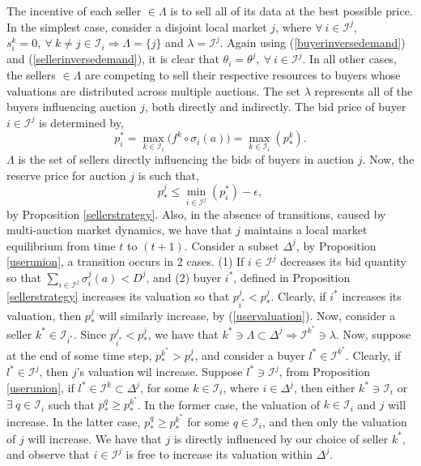 \documentclass[sigconf, anonymous]{acmart}
\newcommand{\mcI}{\mathcal{I}}
\newcommand{\g}{\sigma}
\theoremstyle{definition}
\begin{document}
\iffalse
Now, we have,
\begin{equation}\label{rho}
    \rho^j(p_*^j) \le \displaystyle\sum_{i\in\mcI^j} e_i(a(s_i^j)),
\end{equation}
from (\ref{datademand}), (\ref{buyerinversedemand}),
(\ref{sellerinversedemand}), and so $p_i^j \ge p_{*}^j \ge p_i^k, \ \forall \ i \in
[p_i^j]_{i\in\mcI^j}$ and $\forall \ k \in [p_i^k]_{k\in\mcI_i}$
\fi

The incentive of each seller $\in\Lambda$ is to sell all of its data at the
best possible price. In the simplest case,
consider a disjoint local market $j$, where $\forall \ i\in\mcI^j$, $s_i^k = 0,
\ \forall \ k\ne j \in \mcI_i \Rightarrow \Lambda = \lbrace j \rbrace$ and
$\lambda = \mcI^j$. 
Again using (\ref{buyerinversedemand}) and  (\ref{sellerinversedemand}), it is
clear that $\theta_i = \theta^j, \ \forall \ i \in \mcI^j$.
In all other cases, the sellers $\in\Lambda$ are competing to sell
their respective resources to buyers whose valuations are distributed across multiple auctions. 
The set $\lambda$ represents all of the buyers influencing auction $j$, both
directly and indirectly. 
The bid price of buyer $i\in\mcI^j$ is determined by,
\begin{equation}\label{maxbid}
    p_i^* = \max_{k\in\mcI_i}\big(f^k \circ \g_i(a)\big)= \max_{k\in\mcI_i}(p_*^k).
\end{equation}
$\Lambda$ is the set of sellers directly influencing the bids of buyers
in auction $j$. Now, the reserve price for auction $j$ is such that,
\begin{equation}\label{resprice}
    p_*^j \le \min_{i\in\mcI^j}(p_i^*) - \epsilon,
\end{equation}
by Proposition \ref{sellerstrategy}. 
Also, in the absence of transitions, caused by multi-auction market dynamics, we have 
that $j$ maintains a local market
equilibrium from time $t$ to $(t+1)$.
Consider a subset $\Delta^j$, by
Proposition \ref{userunion}, a transition occurs in 2 cases. (1) If $i\in\mcI^j$
decreases its bid quantity so that $\sum_{i\in\mcI^j}
\g_i^j(a) < D^j$, and (2) buyer $i^*$, defined in Proposition
\ref{sellerstrategy} increases its valuation so that $p_{i^*}^j <
p_*^j$. Clearly, if $i^*$ increases its valuation,
then $p_*^j$ will similarly increase, by (\ref{uservaluation}). Now, consider a
seller $k^*\in\mcI_{i^*}$. Since $p_{i^*}^j <
p_*^j$, we have that $k^*\ni\Lambda\subset \Delta^j\Rightarrow \mcI^{k^*} \ni
\lambda$. Now, suppose at the end of some time step, $p_*^{k^*} > p_*^j$, and
consider a buyer $l^*\in\mcI^{k^*}$. Clearly, if $l^*\in\mcI^j$, then $j$'s
valuation wil increase. Suppose $l^*\ni\mcI^j$, from Proposition \ref{userunion}, if $l^*\in\mcI^k\subset
\Delta^j$, for some $k\in\mcI_i$, where $i\in\Delta^j$, then either
$k^*\ni\mcI_i$ or $\exists \ q\in\mcI_i$ such that $p_*^q \ge p_*^{k^*}$. In
the former case, the valuation of $k\in\mcI_i$ and $j$ will increase.
In the latter case, $p_*^q \ge p_*^{k^*}$ for some
$q\in\mcI_i$, and then only the valuation of $j$ will increase. We have that $j$ is
directly influenced by our choice of seller $k^*$, and observe that
$i\in\mcI^j$ is free to increase its valuation within $\Delta^j$. 
\end{document}
